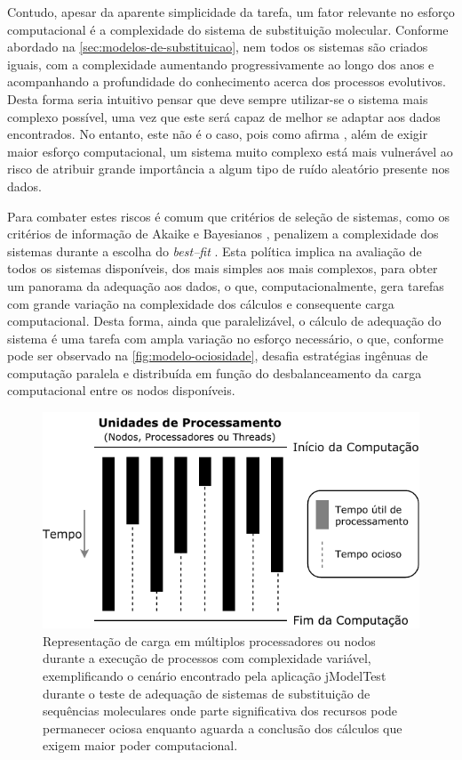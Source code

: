 \documentclass[english,brazilian]{UNISINOSmonografia} %
\newcommand\defaultFigureWidth{0.9}
\begin{document}
Contudo, apesar da aparente simplicidade da tarefa, um fator relevante no esforço computacional é a complexidade do sistema de substituição molecular.
Conforme abordado na \autoref{sec:modelos-de-substituicao}, nem todos os sistemas são criados iguais, com a complexidade aumentando progressivamente ao longo dos anos e acompanhando a profundidade do conhecimento acerca dos processos evolutivos.
Desta forma seria intuitivo pensar que deve sempre utilizar-se o sistema mais complexo possível, uma vez que este será capaz de melhor se adaptar aos dados encontrados. 
No entanto, este não é o caso, pois como afirma , além de exigir maior esforço computacional, um sistema muito complexo está mais vulnerável ao risco de atribuir grande importância a algum tipo de ruído aleatório presente nos dados.


Para combater estes riscos é comum que critérios de seleção de sistemas, como os critérios de informação de Akaike \cite{Akaike1974} e Bayesianos \cite{Schwarz1978}, penalizem a complexidade dos sistemas durante a escolha do \textit{best--fit} \cite{yang2014molecular}.
Esta política implica na avaliação de todos os sistemas disponíveis, dos mais simples aos mais complexos, para obter um panorama da adequação aos dados, o que, computacionalmente, gera tarefas com grande variação na complexidade dos cálculos e consequente carga computacional.
Desta forma, ainda que paralelizável, o cálculo de adequação do sistema é uma tarefa com ampla variação no esforço necessário, o que, conforme pode ser observado na \autoref{fig:modelo-ociosidade}, desafia estratégias ingênuas de computação paralela e distribuída em função do desbalanceamento da carga computacional entre os nodos disponíveis.


\begin{figure}[tb]
	\centering%
	\begin{minipage}{\defaultFigureWidth\textwidth}
		\caption{Representação de carga em múltiplos processadores ou nodos durante a execução de processos com complexidade variável, exemplificando o cenário encontrado pela aplicação jModelTest durante o teste de adequação de sistemas de substituição de sequências moleculares onde parte significativa dos recursos pode permanecer ociosa enquanto aguarda a conclusão dos cálculos que exigem maior poder computacional.}
		\label{fig:modelo-ociosidade}
		\centering
		\includegraphics{modelo-ociosidade}
	\end{minipage}
\end{figure}
\end{document}
